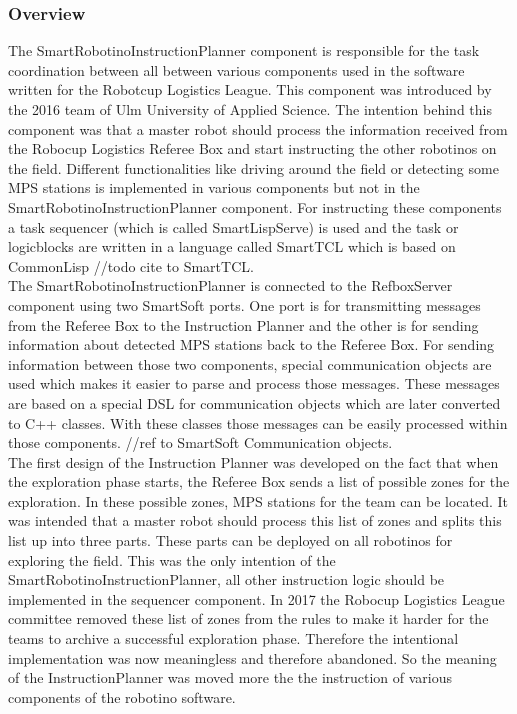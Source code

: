 \subsubsection{Overview}
\label{sec:inst_overview}

The SmartRobotinoInstructionPlanner component is responsible for the task coordination between all between various components used in the software written for the 
Robotcup Logistics League. This component was introduced by the 2016 team of Ulm University of Applied Science. The intention behind this component was that a master robot should process the information received from the Robocup Logistics Referee Box and start instructing the other robotinos on the field. Different functionalities like driving around the field or detecting some MPS stations is implemented in various components but not in the SmartRobotinoInstructionPlanner component. For instructing these components a task sequencer (which is called SmartLispServe) is used and the task or logicblocks are written in a language called SmartTCL which is based on CommonLisp //todo cite to SmartTCL. \\ 

The SmartRobotinoInstructionPlanner is connected to the RefboxServer component using two SmartSoft ports. One port is for transmitting messages from the Referee Box to the Instruction Planner and the other is for sending information about detected MPS stations back to the Referee Box. For sending information between those two components, special communication objects are used which makes it easier to parse and process those messages. These messages are based on a special DSL for communication objects which are later converted to C++ classes. With these classes those messages can be easily processed within those components. //ref to SmartSoft Communication objects. \\

The first design of the Instruction Planner was developed on the fact that when the exploration phase starts, the Referee Box sends a list of possible zones for the exploration. In these possible zones, MPS stations for the team can be located. It was intended that a master robot should process this list of zones and splits this list up into three parts. These parts can be deployed on all robotinos for exploring the field. This was the only intention of the SmartRobotinoInstructionPlanner, all other instruction logic should be implemented in the sequencer component. In 2017 the Robocup Logistics League committee removed these list of zones from the rules to make it harder for the teams to archive a successful exploration phase. Therefore the intentional implementation was now meaningless and therefore abandoned. So the meaning of the InstructionPlanner was moved more the the instruction of various components of the robotino software. \\


